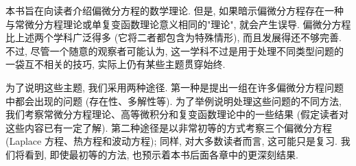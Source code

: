 本书旨在向读者介绍偏微分方程的数学理论. 但是, 如果暗示偏微分方程存在一种与常微分方程理论或单复变函数理论意义相同的"理论", 就会产生误导. 偏微分方程比上述两个学科广泛得多 (它将二者都包含为特殊情形), 而且发展得还不够完善. 不过, 尽管一个随意的观察者可能认为, 这一学科不过是用于处理不同类型问题的一袋互不相关的技巧, 实际上仍有某些主题贯穿始终.

为了说明这些主题, 我们采用两种途径. 第一种是提出一组在许多偏微分方程问题中都会出现的问题 (存在性、多解性等). 为了举例说明处理这些问题的不同方法, 我们考察常微分方程理论、高等微积分和复变函数理论中的一些结果 (假定读者对这些内容已有一定了解). 第二种途径是以非常初等的方式考察三个偏微分方程 (Laplace 方程、热方程和波动方程); 同样, 对大多数读者而言, 这可能只是复习. 我们将看到, 即使最初等的方法, 也预示着本书后面各章中的更深刻结果.
